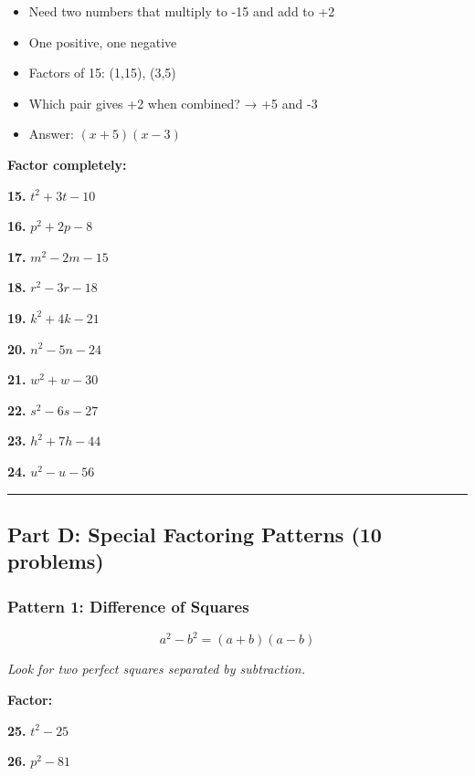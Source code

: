 \documentclass[
  11pt,
]{article}
\providecommand{\tightlist}{%
  \setlength{\itemsep}{0pt}\setlength{\parskip}{0pt}}
\begin{document}
\begin{itemize}
\tightlist
\item
  Need two numbers that multiply to -15 and add to +2
\item
  One positive, one negative
\item
  Factors of 15: (1,15), (3,5)
\item
  Which pair gives +2 when combined? → +5 and -3
\item
  Answer: \((x + 5)(x - 3)\)
\end{itemize}

\textbf{Factor completely:}

\textbf{15.} \(t^2 + 3t - 10\)

\textbf{16.} \(p^2 + 2p - 8\)

\textbf{17.} \(m^2 - 2m - 15\)

\textbf{18.} \(r^2 - 3r - 18\)

\textbf{19.} \(k^2 + 4k - 21\)

\textbf{20.} \(n^2 - 5n - 24\)

\textbf{21.} \(w^2 + w - 30\)

\textbf{22.} \(s^2 - 6s - 27\)

\textbf{23.} \(h^2 + 7h - 44\)

\textbf{24.} \(u^2 - u - 56\)

\begin{center}\rule{0.5\linewidth}{0.5pt}\end{center}

\hypertarget{part-d-special-factoring-patterns-10-problems}{%
\subsection{Part D: Special Factoring Patterns (10
problems)}\label{part-d-special-factoring-patterns-10-problems}}

\hypertarget{pattern-1-difference-of-squares}{%
\subsubsection{Pattern 1: Difference of
Squares}\label{pattern-1-difference-of-squares}}

\[a^2 - b^2 = (a + b)(a - b)\]

\emph{Look for two perfect squares separated by subtraction.}

\textbf{Factor:}

\textbf{25.} \(t^2 - 25\)

\textbf{26.} \(p^2 - 81\)
\end{document}
